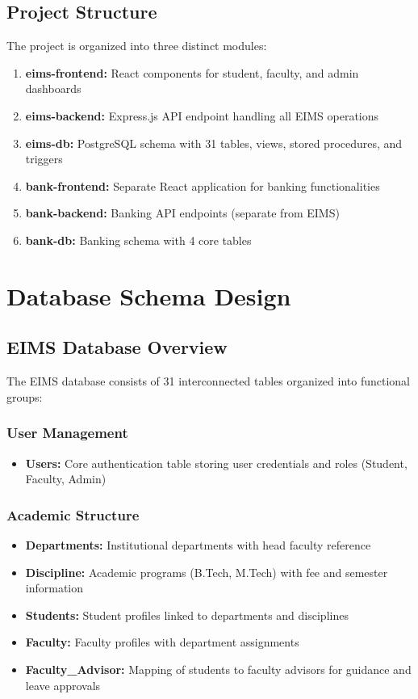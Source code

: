 \documentclass[12pt]{article}
\begin{document}
\subsection{Project Structure}

The project is organized into three distinct modules:

\begin{enumerate}
    \item \textbf{eims-frontend:} React components for student, faculty, and admin dashboards
    \item \textbf{eims-backend:} Express.js API endpoint handling all EIMS operations
    \item \textbf{eims-db:} PostgreSQL schema with 31 tables, views, stored procedures, and triggers
    \item \textbf{bank-frontend:} Separate React application for banking functionalities
    \item \textbf{bank-backend:} Banking API endpoints (separate from EIMS)
    \item \textbf{bank-db:} Banking schema with 4 core tables
\end{enumerate}

\newpage

\section{Database Schema Design}

\subsection{EIMS Database Overview}

The EIMS database consists of 31 interconnected tables organized into functional groups:

\subsubsection{User Management}
\begin{itemize}
    \item \textbf{Users:} Core authentication table storing user credentials and roles (Student, Faculty, Admin)
\end{itemize}

\subsubsection{Academic Structure}
\begin{itemize}
    \item \textbf{Departments:} Institutional departments with head faculty reference
    \item \textbf{Discipline:} Academic programs (B.Tech, M.Tech) with fee and semester information
    \item \textbf{Students:} Student profiles linked to departments and disciplines
    \item \textbf{Faculty:} Faculty profiles with department assignments
    \item \textbf{Faculty\_Advisor:} Mapping of students to faculty advisors for guidance and leave approvals
\end{itemize}
\end{document}
